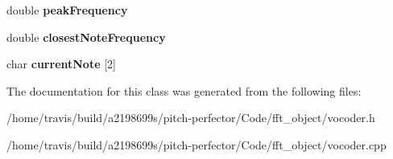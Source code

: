 \begin{DoxyCompactItemize}
\item 
\hypertarget{classVocoder_abae7bb20fa180d030d6a96f08af48429}{double {\bfseries peak\-Frequency}}\label{classVocoder_abae7bb20fa180d030d6a96f08af48429}

\item 
\hypertarget{classVocoder_a6550fbf8de5847c7d5a6fcb90b4f3c2b}{double {\bfseries closest\-Note\-Frequency}}\label{classVocoder_a6550fbf8de5847c7d5a6fcb90b4f3c2b}

\item 
\hypertarget{classVocoder_acdf99dd6f1b47d1bcf539c87b1500c56}{char {\bfseries current\-Note} \mbox{[}2\mbox{]}}\label{classVocoder_acdf99dd6f1b47d1bcf539c87b1500c56}

\end{DoxyCompactItemize}


The documentation for this class was generated from the following files\-:\begin{DoxyCompactItemize}
\item 
/home/travis/build/a2198699s/pitch-\/perfector/\-Code/fft\-\_\-object/vocoder.\-h\item 
/home/travis/build/a2198699s/pitch-\/perfector/\-Code/fft\-\_\-object/vocoder.\-cpp\end{DoxyCompactItemize}
